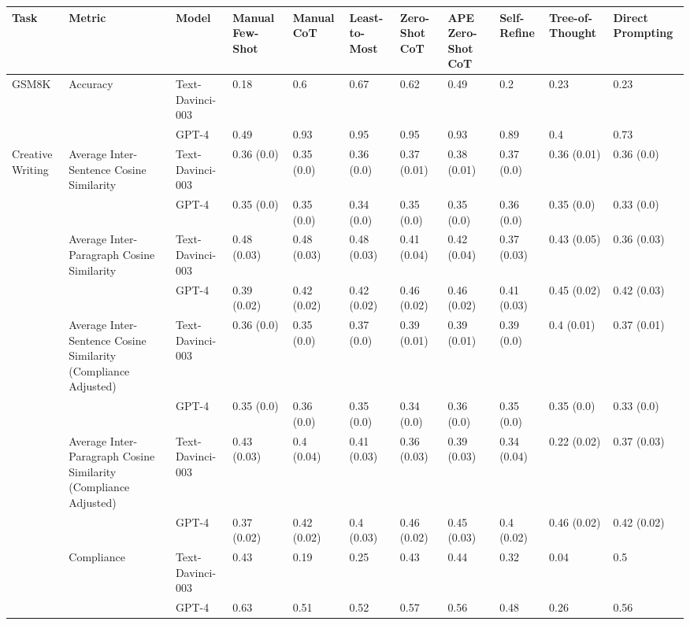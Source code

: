\begin{tabular}{lllllllllll}
\toprule
Task & Metric & Model & Manual Few-Shot & Manual CoT & Least-to-Most & Zero-Shot CoT & APE Zero-Shot CoT & Self-Refine & Tree-of-Thought & Direct Prompting \\
\midrule
GSM8K & Accuracy & Text-Davinci-003 & 0.18 & 0.6 & 0.67 & 0.62 & 0.49 & 0.2 & 0.23 & 0.23 \\
 &  & GPT-4 & 0.49 & 0.93 & 0.95 & 0.95 & 0.93 & 0.89 & 0.4 & 0.73 \\
Creative Writing & Average Inter-Sentence Cosine Similarity & Text-Davinci-003 & 0.36 (0.0) & 0.35 (0.0) & 0.36 (0.0) & 0.37 (0.01) & 0.38 (0.01) & 0.37 (0.0) & 0.36 (0.01) & 0.36 (0.0) \\
 &  & GPT-4 & 0.35 (0.0) & 0.35 (0.0) & 0.34 (0.0) & 0.35 (0.0) & 0.35 (0.0) & 0.36 (0.0) & 0.35 (0.0) & 0.33 (0.0) \\
 & Average Inter-Paragraph Cosine Similarity & Text-Davinci-003 & 0.48 (0.03) & 0.48 (0.03) & 0.48 (0.03) & 0.41 (0.04) & 0.42 (0.04) & 0.37 (0.03) & 0.43 (0.05) & 0.36 (0.03) \\
 &  & GPT-4 & 0.39 (0.02) & 0.42 (0.02) & 0.42 (0.02) & 0.46 (0.02) & 0.46 (0.02) & 0.41 (0.03) & 0.45 (0.02) & 0.42 (0.03) \\
 & Average Inter-Sentence Cosine Similarity (Compliance Adjusted) & Text-Davinci-003 & 0.36 (0.0) & 0.35 (0.0) & 0.37 (0.0) & 0.39 (0.01) & 0.39 (0.01) & 0.39 (0.0) & 0.4 (0.01) & 0.37 (0.01) \\
 &  & GPT-4 & 0.35 (0.0) & 0.36 (0.0) & 0.35 (0.0) & 0.34 (0.0) & 0.36 (0.0) & 0.35 (0.0) & 0.35 (0.0) & 0.33 (0.0) \\
 & Average Inter-Paragraph Cosine Similarity (Compliance Adjusted) & Text-Davinci-003 & 0.43 (0.03) & 0.4 (0.04) & 0.41 (0.03) & 0.36 (0.03) & 0.39 (0.03) & 0.34 (0.04) & 0.22 (0.02) & 0.37 (0.03) \\
 &  & GPT-4 & 0.37 (0.02) & 0.42 (0.02) & 0.4 (0.03) & 0.46 (0.02) & 0.45 (0.03) & 0.4 (0.02) & 0.46 (0.02) & 0.42 (0.02) \\
 & Compliance & Text-Davinci-003 & 0.43 & 0.19 & 0.25 & 0.43 & 0.44 & 0.32 & 0.04 & 0.5 \\
 &  & GPT-4 & 0.63 & 0.51 & 0.52 & 0.57 & 0.56 & 0.48 & 0.26 & 0.56 \\
\bottomrule
\end{tabular}
